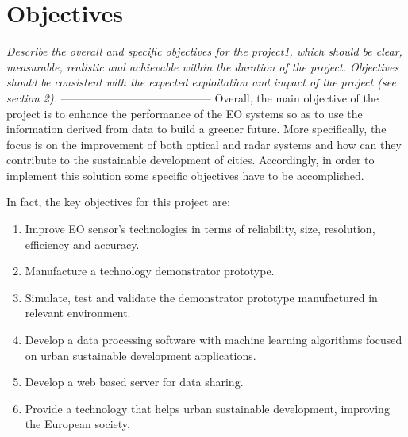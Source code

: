 \section{Objectives}

\textit{Describe the overall and specific objectives for the project1, which should be clear, measurable, realistic and achievable within the duration of the project. Objectives should be consistent with the expected exploitation and impact of the project (see section 2). }
-----------------------------------------
Overall, the main objective of the project is to enhance the performance of the
EO systems so as to use the information derived from data to build a greener future. More
specifically, the focus is on the improvement of both optical and radar systems and how can
they contribute to the sustainable development of cities. Accordingly, in order to implement this solution some specific objectives have to be accomplished.

In fact, the key objectives for this project are:

\begin{enumerate}

	\item Improve EO sensor's technologies in terms of reliability, size, resolution, efficiency and accuracy.

	\item Manufacture a technology demonstrator prototype.

	\item Simulate, test and validate the demonstrator prototype manufactured in relevant environment.

	\item Develop a data processing software with machine learning algorithms focused on urban sustainable development applications. 

	\item Develop a web based server for data sharing. 

	\item Provide a technology that helps urban sustainable development, improving the European society.
 
\end{enumerate}